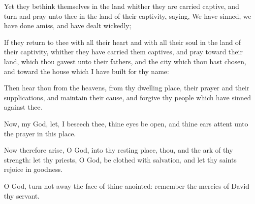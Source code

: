 {Yet
{} they
bethink themselves in the
land whither they are carried
captive, and
turn and
pray unto thee in the
land of their
captivity,
saying, We have
sinned, we have done
amiss, and have dealt
wickedly;

If they
return to thee with all their
heart and with all their
soul in the
land of their
captivity, whither they have carried them
captives, and
pray
toward their
land, which thou
gavest unto their
fathers, and
{} the
city which thou hast
chosen, and toward the
house which I have
built for thy
name:

Then
hear thou from the
heavens,
{} from thy
dwelling
place, their
prayer and their
supplications, and
maintain their
cause, and
forgive thy
people which have
sinned against thee.

Now, my
God, let, I beseech thee, thine
eyes be
open, and
{} thine
ears
{}
attent unto the
prayer
{} in this
place.

Now therefore
arise, O
{}
God, into thy
resting place, thou, and the
ark of thy
strength: let thy
priests, O
{}
God, be
clothed with
salvation, and let thy
saints
rejoice in
goodness.

O
{}
God, turn not
away the
face of thine
anointed:
remember the
mercies of
David thy
servant.




\par }
